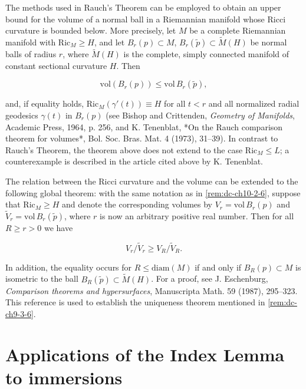 \begin{remark}[Remark 2.6]
  \label{rem:dc-ch10-2-6}
  The methods used in Rauch's Theorem can be employed to obtain an upper bound for
  the volume of a normal ball in a Riemannian manifold whose Ricci curvature is
  bounded below. More precisely, let $M$ be a complete Riemannian manifold with
  $\mathrm{Ric}_M\geq H$, and let $B_r(p)\subset M$, $B_r(\tilde p)\subset\widetilde{M}(H)$
  be normal balls of radius $r$, where $\widetilde{M}(H)$ is the complete, simply
  connected manifold of constant sectional curvature $H$. Then
  
  $$
  \mathrm{vol}(B_r(p))\leq\mathrm{vol}\,B_r(\tilde p),
  $$
  
  and, if equality holds, $\mathrm{Ric}_M(\gamma'(t))\equiv H$ for all $t<r$ and all
  normalized radial geodesics $\gamma(t)$ in $B_r(p)$ (see Bishop and Crittenden,
  \emph{Geometry of Manifolds}, Academic Press, 1964, p. 256, and K. Tenenblat, *On the
  Rauch comparison theorem for volumes*, Bol. Soc. Bras. Mat. 4 (1973), 31–39). In
  contrast to Rauch's Theorem, the theorem above does not extend to the case
  $\mathrm{Ric}_M\leq L$; a counterexample is described in the article cited above
  by K. Tenenblat.
\end{remark}

\begin{remark}[Remark 2.7]
  \label{rem:dc-ch10-2-7}
  The relation between the Ricci curvature and the volume can be extended to the
  following global theorem: with the same notation as in \cref{rem:dc-ch10-2-6}, suppose that
  $\mathrm{Ric}_M\geq H$ and denote the corresponding volumes by $V_r=\mathrm{vol}\,B_r(p)$
  and $\widetilde{V}_r=\mathrm{vol}\,B_r(\tilde p)$, where $r$ is now an arbitrary
  positive real number. Then for all $R\geq r>0$ we have
  
  $$
  V_r/\widetilde{V}_r\geq V_R/\widetilde{V}_R.
  $$
  
  In addition, the equality occurs for $R\leq\mathrm{diam}(M)$ if and only if
  $B_R(p)\subset M$ is isometric to the ball $B_R(\tilde p)\subset\widetilde{M}(H)$.
  For a proof, see J. Eschenburg, \emph{Comparison theorems and hypersurfaces},
  Manuscripta Math. 59 (1987), 295–323. This reference is used to establish the
  uniqueness theorem mentioned in \cref{rem:dc-ch9-3-6}.
\end{remark}

\section{Applications of the Index Lemma to immersions}

